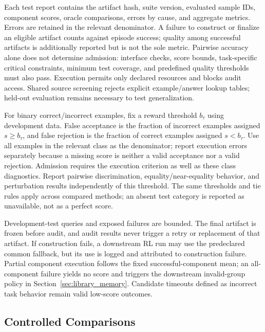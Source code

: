 Each test report contains the artifact hash, suite version, evaluated sample IDs, component scores, oracle comparisons, errors by cause, and aggregate metrics. Errors are retained in the relevant denominator. A failure to construct or finalize an eligible artifact counts against episode success; quality among successful artifacts is additionally reported but is not the sole metric. Pairwise accuracy alone does not determine admission: interface checks, score bounds, task-specific critical constraints, minimum test coverage, and predefined quality thresholds must also pass. Execution permits only declared resources and blocks audit access. Shared source screening rejects explicit example/answer lookup tables; held-out evaluation remains necessary to test generalization.

For binary correct/incorrect examples, fix a reward threshold $b_\tau$ using development data. False acceptance is the fraction of incorrect examples assigned $s\geq b_\tau$, and false rejection is the fraction of correct examples assigned $s<b_\tau$. Use all examples in the relevant class as the denominator; report execution errors separately because a missing score is neither a valid acceptance nor a valid rejection. Admission requires the execution criterion as well as these class diagnostics. Report pairwise discrimination, equality/near-equality behavior, and perturbation results independently of this threshold. The same thresholds and tie rules apply across compared methods; an absent test category is reported as unavailable, not as a perfect score.

Development-test queries and exposed failures are bounded. The final artifact is frozen before audit, and audit results never trigger a retry or replacement of that artifact. If construction fails, a downstream RL run may use the predeclared common fallback, but its use is logged and attributed to construction failure. Partial component execution follows the fixed successful-component mean; an all-component failure yields no score and triggers the downstream invalid-group policy in Section~\ref{sec:library_memory}. Candidate timeouts defined as incorrect task behavior remain valid low-score outcomes.

\subsection{Controlled Comparisons}


